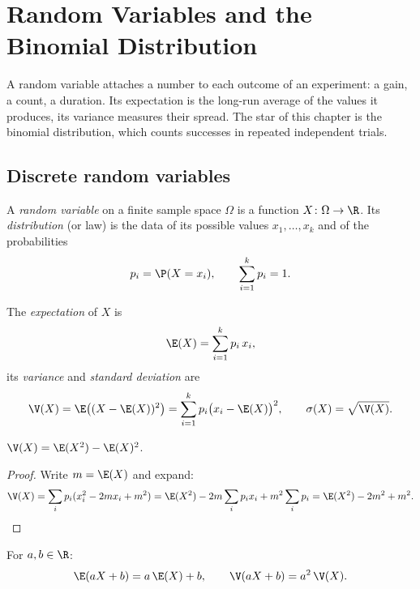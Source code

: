 \chapter{Random Variables and the Binomial Distribution}\label{ch:tle:randvar}

A random variable attaches a number to each outcome of an experiment: a
gain, a count, a duration. Its expectation is the long-run average of the
values it produces, its variance measures their spread. The star of this
chapter is the binomial distribution, which counts successes in repeated
independent trials.

\section{Discrete random variables}

\begin{definition}\label{def:tle:randvar:rv}
A \emph{random variable} on a finite sample space
$\Omega$ is a function $X \colon \Omega \to \R$. Its
\emph{distribution} (or law) is the data of its possible
values $x_1, \dots, x_k$ and of the probabilities
\[
p_i = \P(X = x_i), \qquad \sum_{i=1}^{k} p_i = 1 .
\]
\end{definition}

\begin{definition}\label{def:tle:randvar:exp}
The \emph{expectation} of $X$ is
\[
\E(X) = \sum_{i=1}^{k} p_i\, x_i ,
\]
its \emph{variance} and \emph{standard deviation} are
\[
\V(X) = \E\bigl((X - \E(X))^2\bigr) = \sum_{i=1}^k p_i\bigl(x_i - \E(X)\bigr)^2,
\qquad
\sigma(X) = \sqrt{\V(X)} .
\]
\end{definition}

\begin{proposition}\label{prop:tle:randvar:konig}
$\V(X) = \E(X^2) - \E(X)^2$.
\end{proposition}

\begin{proof}
Write $m = \E(X)$ and expand:
\[
\V(X) = \sum_i p_i (x_i^2 - 2m x_i + m^2)
= \E(X^2) - 2m\sum_i p_i x_i + m^2\sum_i p_i
= \E(X^2) - 2m^2 + m^2 . \qedhere
\]
\end{proof}

\begin{proposition}\label{prop:tle:randvar:affine}
For $a, b \in \R$:
\[
\E(aX + b) = a\,\E(X) + b, \qquad
\V(aX + b) = a^2\,\V(X) .
\]
\end{proposition}

